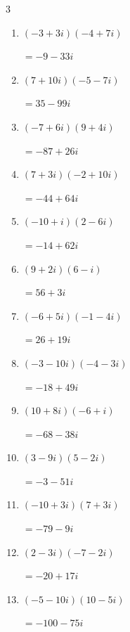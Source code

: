 \begin{multicols}{3}
\begin{enumerate}
        $\displaystyle =-117-27i$

  \item $\displaystyle (-3+3i)(-4+7i)$

        $\displaystyle =-9-33i$

  \item $\displaystyle (7+10i)(-5-7i)$

        $\displaystyle =35-99i$

  \item $\displaystyle (-7+6i)(9+4i)$

        $\displaystyle =-87+26i$

  \item $\displaystyle (7+3i)(-2+10i)$

        $\displaystyle =-44+64i$

  \item $\displaystyle (-10+i)(2-6i)$

        $\displaystyle =-14+62i$

  \item $\displaystyle (9+2i)(6-i)$

        $\displaystyle =56+3i$

  \item $\displaystyle (-6+5i)(-1-4i)$

        $\displaystyle =26+19i$

  \item $\displaystyle (-3-10i)(-4-3i)$

        $\displaystyle =-18+49i$

  \item $\displaystyle (10+8i)(-6+i)$

        $\displaystyle =-68-38i$

  \item $\displaystyle (3-9i)(5-2i)$

        $\displaystyle =-3-51i$

  \item $\displaystyle (-10+3i)(7+3i)$

        $\displaystyle =-79-9i$

  \item $\displaystyle (2-3i)(-7-2i)$

        $\displaystyle =-20+17i$

  \item $\displaystyle (-5-10i)(10-5i)$

        $\displaystyle =-100-75i$

\columnbreak %


\end{enumerate}
\end{multicols}

